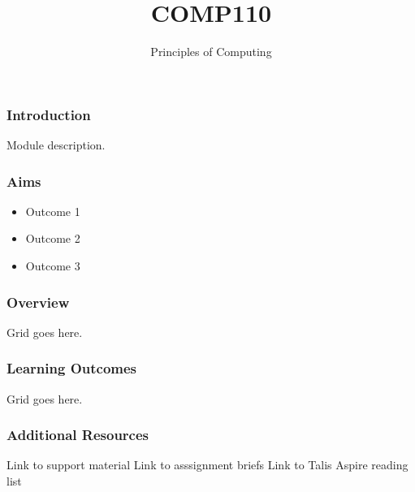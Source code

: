 \documentclass[handout, xcolor={dvipsnames}]{beamer}\usepackage{etoolbox}\newtoggle{printable}\toggletrue{printable}
\begin{document}
\title{COMP110}
\subtitle{Principles of Computing}

\frame{\titlepage} 

\begin{frame}
	\frametitle{Introduction}

	Module description.	
	
\end{frame}

\begin{frame}
	\frametitle{Aims}
	\begin{itemize}
		\item Outcome 1
		\item Outcome 2
		\item Outcome 3
	\end{itemize}
\end{frame}

\begin{frame}
	\frametitle{Overview}
	
	Grid goes here.
\end{frame}

\begin{frame}
	\frametitle{Learning Outcomes}
	
	Grid goes here.
\end{frame}

\begin{frame}
	\frametitle{Additional Resources}
	
	Link to support material
	Link to asssignment briefs
	Link to Talis Aspire reading list
\end{frame}
\end{document}
